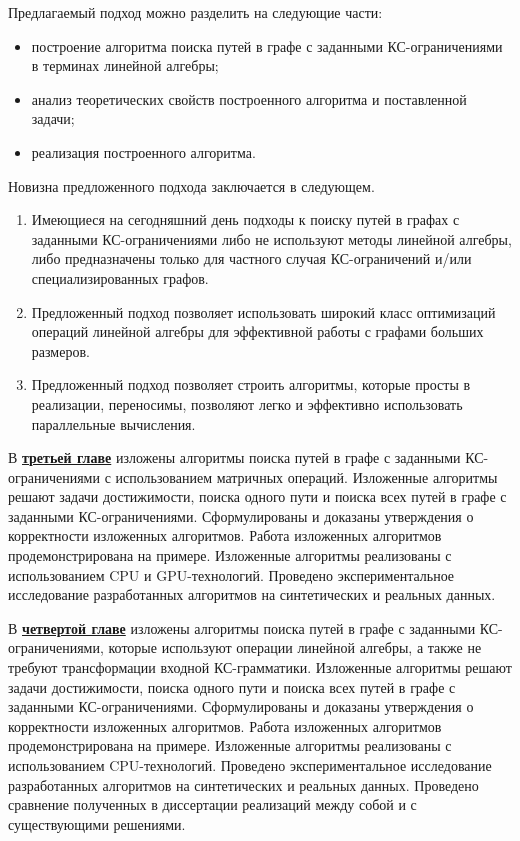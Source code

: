 Предлагаемый подход можно разделить на следующие части:
\begin{itemize}
    \item построение алгоритма поиска путей в графе с заданными КС-ограничениями в терминах линейной алгебры;
    \item анализ теоретических свойств построенного алгоритма и поставленной задачи;
    \item реализация построенного алгоритма.
\end{itemize}

Новизна предложенного подхода заключается в следующем.
\begin{enumerate}
    \item Имеющиеся на сегодняшний день подходы к поиску путей в графах с заданными КС-ограничениями либо не используют методы линейной алгебры, либо предназначены только для частного случая КС-ограничений и/или специализированных графов.
    \item Предложенный подход позволяет использовать широкий класс оптимизаций операций линейной алгебры для эффективной работы с графами больших размеров.
    \item Предложенный подход позволяет строить алгоритмы, которые просты в реализации, переносимы, позволяют легко и эффективно использовать параллельные вычисления.
\end{enumerate}


В \underline{\textbf{третьей главе}} изложены алгоритмы поиска путей в графе с заданными КС-ограничениями с использованием матричных операций. Изложенные алгоритмы решают задачи достижимости, поиска одного пути и поиска всех путей в графе с заданными КС-ограничениями. Сформулированы и доказаны утверждения о корректности изложенных алгоритмов. Работа изложенных алгоритмов продемонстрирована на примере. Изложенные алгоритмы реализованы с использованием CPU и GPU-технологий. Проведено экспериментальное исследование разработанных алгоритмов на синтетических и реальных данных.

В \underline{\textbf{четвертой главе}} изложены алгоритмы поиска путей в графе с заданными КС-ограничениями, которые используют операции линейной алгебры, а также не требуют трансформации входной КС-грамматики. Изложенные алгоритмы решают задачи достижимости, поиска одного пути и поиска всех путей в графе с заданными КС-ограничениями. Сформулированы и доказаны утверждения о корректности изложенных алгоритмов. Работа изложенных алгоритмов продемонстрирована на примере. Изложенные алгоритмы реализованы с использованием CPU-технологий. Проведено экспериментальное исследование разработанных алгоритмов на синтетических и реальных данных. Проведено сравнение полученных в диссертации реализаций между собой и с существующими решениями.


